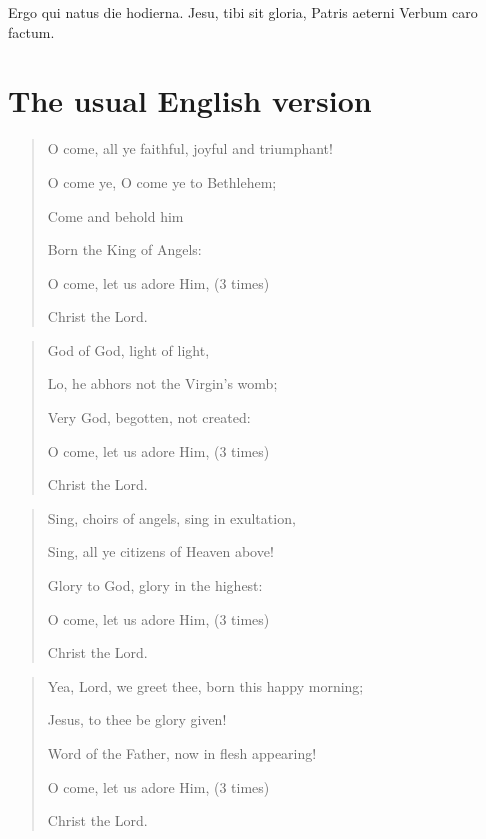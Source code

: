 \documentclass[a4paper]{article}
\begin{document}
%
%
%
%

Ergo qui natus die hodierna.
Jesu, tibi sit gloria,
Patris aeterni Verbum caro factum.

\section{The usual English version}

\begin{quotation}
    O come, all ye faithful, joyful and triumphant!

    O come ye, O come ye to Bethlehem;

    Come and behold him

    Born the King of Angels:
    
    O come, let us adore Him, (3 times)
    
    Christ the Lord.
\end{quotation}

\begin{quotation}
    God of God, light of light,

    Lo, he abhors not the Virgin's womb;
    
    Very God, begotten, not created:
    
    O come, let us adore Him, (3 times)
    
    Christ the Lord.
\end{quotation}

\begin{quotation}
    Sing, choirs of angels, sing in exultation,
    
    Sing, all ye citizens of Heaven above!
    
    Glory to God, glory in the highest:
    
    O come, let us adore Him, (3 times)
    
    Christ the Lord.
\end{quotation}

\begin{quotation}
    Yea, Lord, we greet thee, born this happy morning;
    
    Jesus, to thee be glory given!
    
    Word of the Father, now in flesh appearing!
    
    O come, let us adore Him, (3 times)
    
    Christ the Lord.
\end{quotation}



\end{document}
